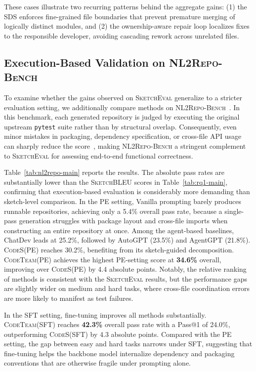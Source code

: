 \documentclass[format=acmsmall, review=false, screen=true]{acmart}
\newcommand{\tool}{\textsc{CodeTeam}\xspace}
\newcommand{\codes}{\textsc{CodeS}\xspace}
\newcommand{\sketcheval}{\textsc{SketchEval}\xspace}
\newcommand{\sketchbleu}{\textsc{SketchBLEU}\xspace}
\newcommand{\nlrepobench}{\textsc{NL2Repo-Bench}\xspace}
\begin{document}
These cases illustrate two recurring patterns behind the aggregate gains: (1) the SDS enforces fine-grained file boundaries that prevent premature merging of logically distinct modules, and (2) the ownership-aware repair loop localizes fixes to the responsible developer, avoiding cascading rework across unrelated files.

\subsection{Execution-Based Validation on \nlrepobench}
\label{subsec:nl2repo-results}

To examine whether the gains observed on \sketcheval generalize to a stricter evaluation setting, we additionally compare methods on \nlrepobench~\cite{Ding2025NL2RepoBench}. In this benchmark, each generated repository is judged by executing the original upstream \texttt{pytest} suite rather than by structural overlap. Consequently, even minor mistakes in packaging, dependency specification, or cross-file API usage can sharply reduce the score~\cite{Ding2025NL2RepoBench}, making \nlrepobench a stringent complement to \sketcheval for assessing end-to-end functional correctness.

Table~\ref{tab:nl2repo-main} reports the results. The absolute pass rates are substantially lower than the \sketchbleu scores in Table~\ref{tab:rq1-main}, confirming that execution-based evaluation is considerably more demanding than sketch-level comparison. In the PE setting, Vanilla prompting barely produces runnable repositories, achieving only a 5.4\% overall pass rate, because a single-pass generation struggles with package layout and cross-file imports when constructing an entire repository at once. Among the agent-based baselines, ChatDev leads at 25.2\%, followed by AutoGPT (23.5\%) and AgentGPT (21.8\%). \codes (PE) reaches 30.2\%, benefiting from its sketch-guided decomposition. \tool (PE) achieves the highest PE-setting score at \textbf{34.6\%} overall, improving over \codes (PE) by 4.4 absolute points. Notably, the relative ranking of methods is consistent with the \sketcheval results, but the performance gaps are slightly wider on medium and hard tasks, where cross-file coordination errors are more likely to manifest as test failures.

In the SFT setting, fine-tuning improves all methods substantially. \tool (SFT) reaches \textbf{42.3\%} overall pass rate with a Pass@1 of 24.0\%, outperforming \codes (SFT) by 4.3 absolute points. Compared with the PE setting, the gap between easy and hard tasks narrows under SFT, suggesting that fine-tuning helps the backbone model internalize dependency and packaging conventions that are otherwise fragile under prompting alone.
\end{document}
